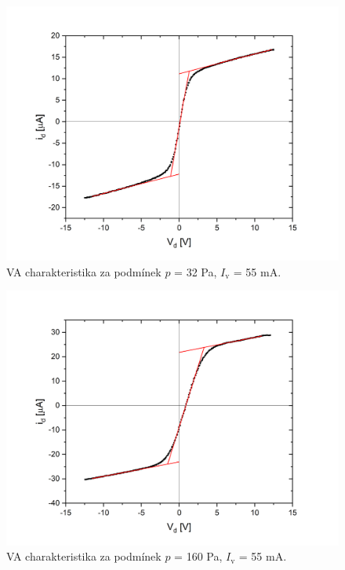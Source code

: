 \documentclass[a4paper,12pt]{article}
\begin{document}
\begin{figure}[h!]
	\centering
	\includegraphics[width=130mm]{dvojna2.png}
	\caption{VA charakteristika za podmínek $p$ = 32 \si{\pascal}, $I_\text{{v}}$ = 55 \si{\milli\ampere}.}
	\label{dvojna2}
\end{figure}
\newpage
\begin{figure}[h!]
	\centering
	\includegraphics[width=130mm]{dvojna3.png}
	\caption{VA charakteristika za podmínek $p$ = 160 \si{\pascal}, $I_\text{{v}}$ = 55 \si{\milli\ampere}.}
	\label{dvojna3}
\end{figure}
\end{document}

